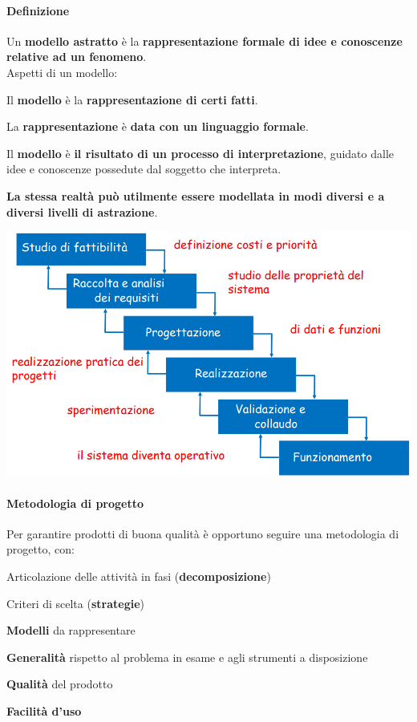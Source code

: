 \documentclass[10pt]{book}
\begin{document}
\paragraph{Definizione} Un \textbf{modello astratto} è la \textbf{rappresentazione formale di idee e conoscenze relative ad un fenomeno}.\\
Aspetti di un modello:
\begin{list}{}{}
	\item Il \textbf{modello} è la \textbf{rappresentazione di certi fatti}.
	\item La \textbf{rappresentazione} è \textbf{data con un linguaggio formale}.
	\item Il \textbf{modello} è \textbf{il risultato di un processo di interpretazione}, guidato dalle idee e conoscenze possedute dal soggetto che interpreta.
\end{list}
\textbf{La stessa realtà può utilmente essere modellata in modi diversi e a diversi livelli di astrazione}.
\begin{center}
\includegraphics[scale=0.7]{modellaz.png}
\end{center}
\paragraph{Metodologia di progetto} Per garantire prodotti di buona qualità è opportuno seguire una metodologia di progetto, con:
\begin{list}{}{}
	\item Articolazione delle attività in fasi (\textbf{decomposizione})
	\item Criteri di scelta (\textbf{strategie})
	\item \textbf{Modelli} da rappresentare
	\item \textbf{Generalità} rispetto al problema in esame e agli strumenti a disposizione
	\item \textbf{Qualità} del prodotto
	\item \textbf{Facilità d'uso}
\end{list}
\end{document}
